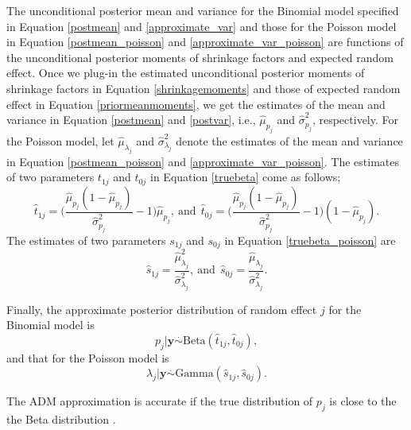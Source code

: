 \documentclass[article]{jss}
\begin{document}
The unconditional posterior mean and variance for the Binomial model specified in Equation \ref{postmean} and \ref{approximate_var} and those for the Poisson model in Equation \ref{postmean_poisson} and \ref{approximate_var_poisson}  are functions of the unconditional posterior moments of shrinkage factors and expected random effect. Once we plug-in the estimated unconditional posterior moments of shrinkage factors in Equation \ref{shrinkagemoments} and those of expected random effect in Equation \ref{priormeanmoments}, we get the estimates of the mean and variance in Equation \ref{postmean}  and \ref{postvar}, i.e., $\hat{\mu}_{p_j}$ and $\hat{\sigma}^2_{p_j}$, respectively. For the Poisson model, let  $\hat{\mu}_{\lambda_j}$ and $\hat{\sigma}^2_{\lambda_j}$ denote the estimates of the mean and variance in Equation \ref{postmean_poisson} and \ref{approximate_var_poisson}. The estimates of two parameters $t_{1j}$ and $t_{0j}$ in Equation \ref{truebeta} come as follows;
\begin{equation}\label{posttrueprob}
\hat{t}_{1j}=\bigg(\frac{\hat{\mu}_{p_j}(1-\hat{\mu}_{p_j})}{\hat{\sigma}^2_{p_j}}-1\bigg)\hat{\mu}_{p_j},~\textrm{and}~~\hat{t}_{0j}=\bigg(\frac{\hat{\mu}_{p_j}(1-\hat{\mu}_{p_j})}{\hat{\sigma}^2_{p_j}}-1\bigg)(1-\hat{\mu}_{p_j}).
\end{equation}
The estimates of two parameters $s_{1j}$ and $s_{0j}$ in Equation \ref{truebeta_poisson} are
\begin{equation}\label{posttrueprob}
\hat{s}_{1j}=\frac{\hat{\mu}_{\lambda_j}^2}{\hat{\sigma}^2_{\lambda_j}},~\textrm{and}~~\hat{s}_{0j}=\frac{\hat{\mu}_{\lambda_j}}{\hat{\sigma}^2_{\lambda_j}}.
\end{equation}


Finally, the approximate posterior distribution of random effect $j$ for the Binomial model is
\begin{equation}\label{trueapprox}
p_j\vert \boldsymbol{y} \stackrel{.}{\sim} \textrm{Beta}(\hat{t}_{1j}, \hat{t}_{0j}),
\end{equation}
and that for the Poisson model is
\begin{equation}\label{trueapprox_poisson}
\lambda_j\vert \boldsymbol{y} \stackrel{.}{\sim} \textrm{Gamma}(\hat{s}_{1j}, \hat{s}_{0j}).
\end{equation}

The ADM approximation is accurate if the true distribution of $p_j$ is close to the the Beta distribution \citep{tang2011, morris2012}.

\end{document}

